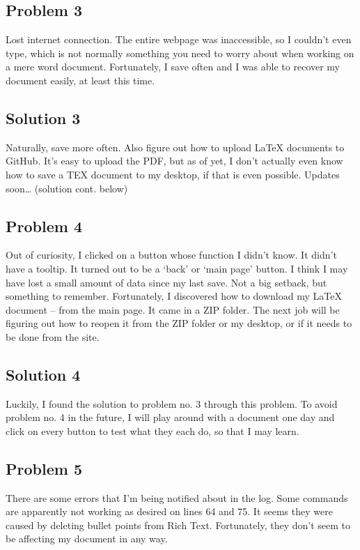 \documentclass{article}
\begin{document}
\subsection{Problem 3}
Lost internet connection. The entire webpage was inaccessible, so I couldn’t even type, which is not normally something you need to worry about when working on a mere word document. Fortunately, I save often and I was able to recover my document easily, at least this time.
\subsection{Solution 3}
Naturally, save more often. Also figure out how to upload LaTeX documents to GitHub. It’s easy to upload the PDF, but as of yet, I don’t actually even know how to save a TEX document to my desktop, if that is even possible. Updates soon… (solution cont. below)

\subsection{Problem 4}
Out of curiosity, I clicked on a button whose function I didn’t know. It didn’t have a tooltip. It turned out to be a ‘back’ or ‘main page’ button. I think I may have lost a small amount of data since my last save. Not a big setback, but something to remember. Fortunately, I discovered how to download my LaTeX document – from the main page. It came in a ZIP folder. The next job will be figuring out how to reopen it from the ZIP folder or my desktop, or if it needs to be done from the site.
\subsection{Solution 4}
Luckily, I found the solution to problem no. 3 through this problem. To avoid problem no. 4 in the future, I will play around with a document one day and click on every button to test what they each do, so that I may learn.

\subsection{Problem 5}
There are some errors that I’m being notified about in the log. Some commands are apparently not working as desired on lines 64 and 75. It seems they were caused by deleting bullet points from Rich Text. Fortunately, they don’t seem to be affecting my document in any way.
\end{document}

